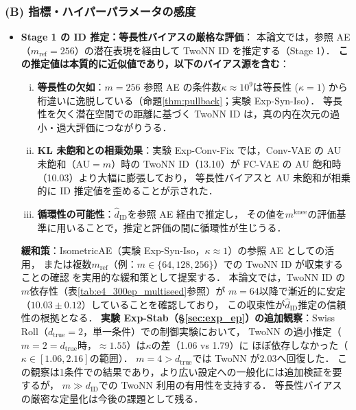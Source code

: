 \documentclass[11pt,a4paper]{jsarticle}
\newcommand{\kap}{\kappa}
\newcommand{\mknee}{m^{\mathrm{knee}}}
\begin{document}
\subsubsection*{(B) 指標・ハイパーパラメータの感度}

\begin{itemize}
  \item \textbf{Stage 1 の ID 推定：等長性バイアスの厳格な評価}：
        本論文では，参照 AE（$m_\mathrm{ref}=256$）の潜在表現を経由して TwoNN ID を推定する（Stage 1）．
        \textbf{この推定値は本質的に近似値であり，以下のバイアス源を含む}：
        \begin{enumerate}[(i)]
          \item \textbf{等長性の欠如}：$m=256$ 参照 AE の条件数$\kap \approx 10^9$は等長性
                ($\kap=1$) から桁違いに逸脱している（命題\ref{thm:pullback}；実験 Exp-Syn-Iso）．
                等長性を欠く潜在空間での距離に基づく TwoNN ID は，真の内在次元の過小・過大評価につながりうる．
          \item \textbf{KL 未飽和との相乗効果}：実験 Exp-Conv-Fix では，Conv-VAE の AU 未飽和（AU$=m$）時の
                TwoNN ID（13.10）が FC-VAE の AU 飽和時（10.03）より大幅に膨張しており，
                等長性バイアスと AU 未飽和が相乗的に ID 推定値を歪めることが示された．
          \item \textbf{循環性の可能性}：$\hat{d}_\mathrm{ID}$を参照 AE 経由で推定し，
                その値を$\mknee$の評価基準に用いることで，推定と評価の間に循環性が生じうる．
        \end{enumerate}
        \textbf{緩和策}：IsometricAE（実験 Exp-Syn-Iso，$\kap \approx 1$）の参照 AE としての活用，
        または複数$m_\mathrm{ref}$（例：$m \in \{64, 128, 256\}$）での TwoNN ID が収束することの確認
        を実用的な緩和策として提案する．
        本論文では，TwoNN ID の$m$依存性（表\ref{tab:e4_300ep_multiseed}参照）が
        $m=64$以降で漸近的に安定（$10.03 \pm 0.12$）していることを確認しており，
        この収束性が$\hat{d}_\mathrm{ID}$推定の信頼性の根拠となる．
        \textbf{実験 Exp-Stab（§\ref{sec:exp_ep}）の追加観察}：Swiss Roll（$d_\mathrm{true}=2$，単一条件）での制御実験において，
        TwoNN の過小推定（$m=2=d_\mathrm{true}$時，$\approx1.55$）は$\kap$の差（1.06 vs 1.79）に
        ほぼ依存しなかった（$\kap \in [1.06, 2.16]$の範囲）．
        $m=4 > d_\mathrm{true}$では TwoNN が$2.03$へ回復した．
        この観察は1条件での結果であり，より広い設定への一般化には追加検証を要するが，
        $m \gg d_\mathrm{ID}$での TwoNN 利用の有用性を支持する．
        等長性バイアスの厳密な定量化は今後の課題として残る．

\end{itemize}
\end{document}
